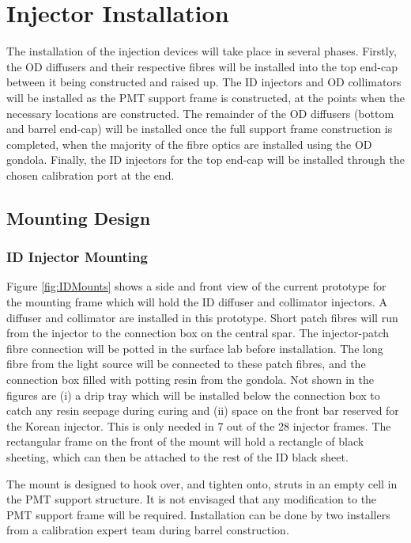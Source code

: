 \documentclass[a4paper,11pt]{article}
\begin{document}
\section{Injector Installation}\label{sec:install}

The installation of the injection devices will take place in several phases. Firstly, the OD diffusers and their respective fibres will be installed into the top end-cap between it being constructed and raised up. The ID injectors and OD collimators will be installed as the PMT support frame is constructed, at the points when the necessary locations are constructed. The remainder of the OD diffusers (bottom and barrel end-cap) will be installed once the full support frame construction is completed, when the majority of the fibre optics are installed using the OD gondola. Finally, the ID injectors for the top end-cap will be installed through the chosen calibration port at the end.

\subsection{Mounting Design}\label{sec:install:sub:mount}

\subsubsection{ID Injector Mounting}\label{sec:install:sub:mount:sub:ID}

Figure \ref{fig:IDMounts} shows a side and front view of the current prototype for the mounting frame which will hold the ID diffuser and collimator injectors. A diffuser and collimator are installed in this prototype. Short patch fibres will run from the injector to the connection box on the central spar. The injector-patch fibre connection will be potted in the surface lab before installation. The long fibre from the light source will be connected to these patch fibres, and the connection box filled with potting resin from the gondola. Not shown in the figures are (i) a drip tray which will be installed below the connection box to catch any resin seepage during curing and (ii) space on the front bar  reserved for the Korean injector. This is only needed in 7 out of the 28 injector frames. The rectangular frame on the front of the mount will hold a rectangle of black sheeting, which can then be attached to the rest of the ID black sheet.

The mount is designed to hook over, and tighten onto, struts in an empty cell in the PMT support structure. It is not envisaged that any modification to the PMT support frame will be required. Installation can be done by two installers from a calibration expert team during barrel construction.
\end{document}
